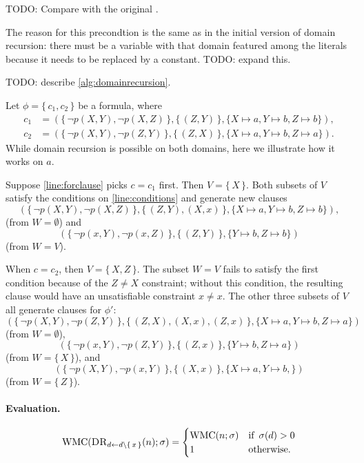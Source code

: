 TODO: Compare with the original \cite{DBLP:conf/nips/Broeck11}.

The reason for this precondtion is the same as in the initial version of domain recursion: there must be a variable with that domain featured among the literals because it needs to be replaced by a constant. TODO: expand this.

TODO: describe \cref{alg:domainrecursion}.

\begin{example}
  Let $\phi = \{\, c_1, c_2 \,\}$ be a formula, where
  \begin{align*}
    c_1 &= (\{\, \neg p(X, Y), \neg p(X, Z) \,\}, \{\, (Z, Y) \,\}, \{ X \mapsto a, Y \mapsto b, Z \mapsto b \}), \\
    c_2 &= (\{\, \neg p(X, Y), \neg p(Z, Y) \,\}, \{\, (Z, X) \,\}, \{ X \mapsto a, Y \mapsto b, Z \mapsto a \}).
  \end{align*}
  While domain recursion is possible on both domains, here we illustrate how it works on $a$.

  Suppose \cref{line:forclause} picks $c = c_1$ first. Then $V = \{\, X \,\}$. Both subsets of $V$ satisfy the conditions on \cref{line:conditions} and generate new clauses
  \[
  (\{\, \neg p(X, Y), \neg p(X, Z) \,\}, \{\, (Z, Y), (X, x) \,\}, \{ X \mapsto a, Y \mapsto b, Z \mapsto b \}),
  \]
  (from $W = \emptyset$) and
  \[
  (\{\, \neg p(x, Y), \neg p(x, Z) \,\}, \{\, (Z, Y) \,\}, \{ Y \mapsto b, Z \mapsto b \})
  \]
  (from $W = V$).

  When $c = c_2$, then $V = \{\, X, Z \,\}$. The subset $W = V$ fails to satisfy the first condition because of the $Z \ne X$ constraint; without this condition, the resulting clause would have an unsatisfiable constraint $x \ne x$. The other three subsets of $V$ all generate clauses for $\phi'$:
  \[
  (\{\, \neg p(X, Y), \neg p(Z, Y) \,\}, \{\, (Z, X), (X, x), (Z, x) \,\}, \{ X \mapsto a, Y \mapsto b, Z \mapsto a \})
  \]
  (from $W = \emptyset$),
  \[
  (\{\, \neg p(x, Y), \neg p(Z, Y) \,\}, \{\, (Z, x) \,\}, \{ Y \mapsto b, Z \mapsto a \})
  \]
  (from $W = \{\, X \,\}$), and
  \[
  (\{\, \neg p(X, Y), \neg p(x, Y) \,\}, \{\, (X, x) \,\}, \{ X \mapsto a, Y \mapsto b, \})
  \]
  (from $W = \{\, Z \,\}$).
\end{example}

\paragraph{Evaluation.}
\[
\operatorname{WMC}(\operatorname{\textsc{DR}}_{d \gets d \setminus \{\, x \,\}}(n); \operatorname{\sigma}) =
\begin{cases}
  \operatorname{WMC}(n; \operatorname{\sigma}) & \text{if } \operatorname{\sigma}(d) > 0 \\
  1 & \text{otherwise.}
\end{cases}
\]

